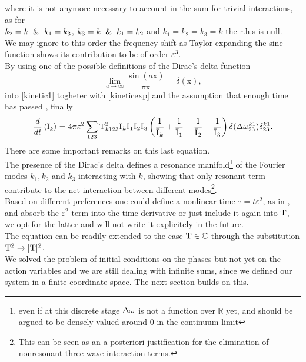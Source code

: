 where it is not anymore necessary to account in the sum for trivial 
interactions, as for \\ $k_2=k \hspace{2mm}\&\hspace{2mm} k_1 = k_3$, $k_3=k \hspace{2mm}\& \hspace{2mm}k_1=k_2$ and $k_1=k_2=k_3=k$ the r.h.s is null.\\
We may ignore to this order the frequency shift as Taylor expanding the sine function shows its contribution to be of order $\varepsilon^3$. \\
By using one of the possible definitions of the Dirac's delta function
\begin{equation}
    \underset{a \rightarrow \infty}{\lim} \frac{\sin(a \mathrm{x})}{\pi\mathrm{x}} = \delta(\mathrm{x}),
    \label{delta}
\end{equation}
into \eqref{kinetic1} togheter with \eqref{kineticexp} and the assumption that enough time has passed
, finally
\begin{equation}
    \frac{d}{dt} \left\langle \mathrm{I}^{}_k\right\rangle = 4 \pi\varepsilon^2 \sum_{123} \mathrm{T}^2_{k123}\bar{\mathrm{I}^{}}_k\bar{\mathrm{I}^{}}_1\bar{\mathrm{I}^{}}_2\bar{\mathrm{I}^{}}_3
    \left(\frac{1}{\bar{\mathrm{I}^{}}_k} + \frac{1}{\bar{\mathrm{I}^{}}_1} - \frac{1}{\bar{\mathrm{I}^{}}_2}- \frac{1}{\bar{\mathrm{I}^{}}_3}  \right)
    \delta(\Delta{\omega}^{k1}_{23})\delta^{k1}_{23}.
    \label{kinetic2}
\end{equation}
There are some important remarks on this last equation. \\
The presence of the Dirac's delta defines a resonance manifold\footnote{even if at this discrete stage $\Delta{\omega}$ is not a function over $\mathbb{R}$ yet,
 and should be argued to be densely valued around $0$ in the continuum limit} of the Fourier modes $k_1, k_2$ and $k_3$ interacting with $k$, 
 showing that only resonant term contribute to the net interaction between different modes\footnote{
    This can be seen as an a posteriori justification for the elimination of nonresonant three wave interaction terms.
}. \\
Based on different preferences one could define a nonlinear time $\tau = t \varepsilon^2$, as in \cite{Onorato2020}, and absorb the 
$\varepsilon^2$ term into the time derivative or just include it again into $\mathrm{T}$, we opt for the latter and will not write it explicitely in the future. \\
The equation can be readily extended to the case $\mathrm{T} \in \mathbb{C}$ through the substitution $\mathrm{T}^2 \rightarrow |\mathrm{T}|^2$.\\
We solved the problem of initial conditions on the phases but not yet on the action variables and we are still dealing with infinite sums, since we defined our system
in a finite coordinate space. The next section builds on this. \\

